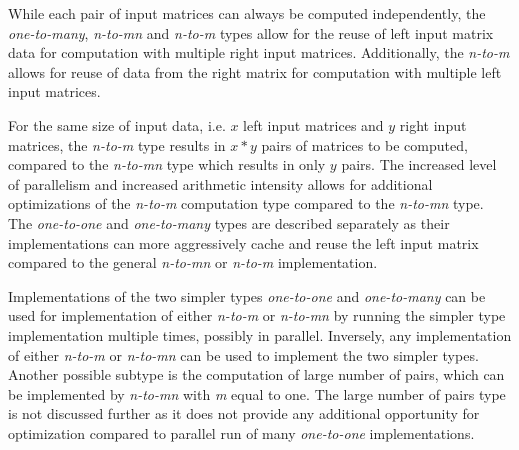 While each pair of input matrices can always be computed independently, the \textit{one-to-many}, \textit{n-to-mn} and \textit{n-to-m} types allow for the reuse of left input matrix data for computation with multiple right input matrices.
Additionally, the \textit{n-to-m} allows for reuse of data from the right matrix for computation with multiple left input matrices. 

For the same size of input data, i.e. $x$ left input matrices and $y$ right input matrices, the \textit{n-to-m} type results in $x*y$ pairs of matrices to be computed, compared to the \textit{n-to-mn} type which results in only $y$ pairs. The increased level of parallelism and increased arithmetic intensity allows for additional optimizations of the \textit{n-to-m} computation type compared to the \textit{n-to-mn} type. The \textit{one-to-one} and \textit{one-to-many} types are described separately as their implementations can more aggressively cache and reuse the left input matrix compared to the general \textit{n-to-mn} or \textit{n-to-m} implementation. 

Implementations of the two simpler types \textit{one-to-one} and \textit{one-to-many} can be used for implementation of either \textit{n-to-m} or \textit{n-to-mn} by running the simpler type implementation multiple times, possibly in parallel. Inversely, any implementation of either \textit{n-to-m} or \textit{n-to-mn} can be used to implement the two simpler types. Another possible subtype is the computation of large number of pairs, which can be implemented by \textit{n-to-mn} with \textit{m} equal to one. The large number of pairs type is not discussed further as it does not provide any additional opportunity for optimization compared to parallel run of many \textit{one-to-one} implementations.

